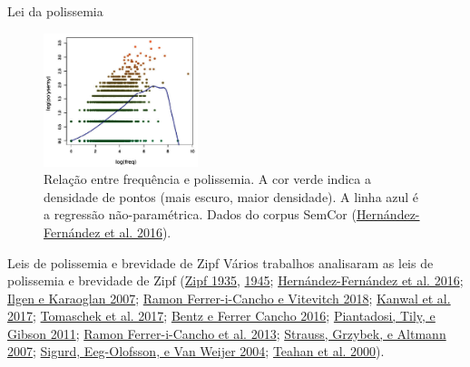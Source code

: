 \documentclass[
  ignorenonframetext,
  aspectratio=169]{beamer}
\begin{document}
\begin{frame}{Lei da polissemia}
\protect\hypertarget{lei-da-polissemia}{}
\begin{figure}
\centering
\includegraphics[width=0.4\textwidth,height=\textheight]{polysemy.png}
\caption{Relação entre frequência e polissemia. A cor verde indica a
densidade de pontos (mais escuro, maior densidade). A linha azul é a
regressão não-paramétrica. Dados do corpus SemCor
(\protect\hyperlink{ref-hernandez2016testing}{Hernández-Fernández et al.
2016}).}
\end{figure}

\end{frame}

\begin{frame}{Leis de polissemia e brevidade de Zipf}
\protect\hypertarget{leis-de-polissemia-e-brevidade-de-zipf}{}
Vários trabalhos analisaram as leis de polissemia e brevidade de Zipf
(\protect\hyperlink{ref-zipf1935}{Zipf 1935},
\protect\hyperlink{ref-zipf1945}{1945};
\protect\hyperlink{ref-hernandez2016testing}{Hernández-Fernández et al.
2016}; \protect\hyperlink{ref-ilgen2007investigation}{Ilgen e Karaoglan
2007}; \protect\hyperlink{ref-cancho2018origins}{Ramon Ferrer-i-Cancho e
Vitevitch 2018}; \protect\hyperlink{ref-kanwal2017}{Kanwal et al. 2017};
\protect\hyperlink{ref-tomaschek2017word}{Tomaschek et al. 2017};
\protect\hyperlink{ref-bentz2016zipf}{Bentz e Ferrer Cancho 2016};
\protect\hyperlink{ref-piantadosi2011word}{Piantadosi, Tily, e Gibson
2011}; \protect\hyperlink{ref-cancho2013compression}{Ramon
Ferrer-i-Cancho et al. 2013};
\protect\hyperlink{ref-strauss2007word}{Strauss, Grzybek, e Altmann
2007}; \protect\hyperlink{ref-sigurd2004word}{Sigurd, Eeg-Olofsson, e
Van Weijer 2004}; \protect\hyperlink{ref-teahan2000compression}{Teahan
et al. 2000}).

\end{frame}
\end{document}
